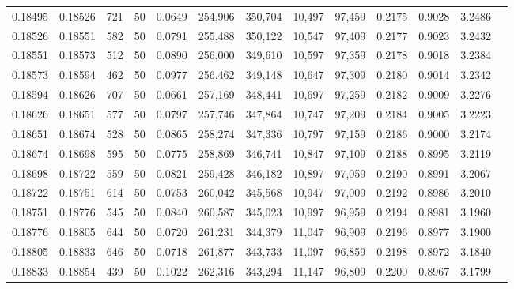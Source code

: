 \begin{tabular}{rrrrrrrrrrrrr}
0.18495 & 0.18526 &   721 &  50 &                                     0.0649 & 254,906 & 350,704 &  10,497 &  97,459 & 0.2175 & 0.9028 & 3.2486 \\
0.18526 & 0.18551 &   582 &  50 &                                     0.0791 & 255,488 & 350,122 &  10,547 &  97,409 & 0.2177 & 0.9023 & 3.2432 \\
0.18551 & 0.18573 &   512 &  50 &                                     0.0890 & 256,000 & 349,610 &  10,597 &  97,359 & 0.2178 & 0.9018 & 3.2384 \\
0.18573 & 0.18594 &   462 &  50 &                                     0.0977 & 256,462 & 349,148 &  10,647 &  97,309 & 0.2180 & 0.9014 & 3.2342 \\
0.18594 & 0.18626 &   707 &  50 &                                     0.0661 & 257,169 & 348,441 &  10,697 &  97,259 & 0.2182 & 0.9009 & 3.2276 \\
0.18626 & 0.18651 &   577 &  50 &                                     0.0797 & 257,746 & 347,864 &  10,747 &  97,209 & 0.2184 & 0.9005 & 3.2223 \\
0.18651 & 0.18674 &   528 &  50 &                                     0.0865 & 258,274 & 347,336 &  10,797 &  97,159 & 0.2186 & 0.9000 & 3.2174 \\
0.18674 & 0.18698 &   595 &  50 &                                     0.0775 & 258,869 & 346,741 &  10,847 &  97,109 & 0.2188 & 0.8995 & 3.2119 \\
0.18698 & 0.18722 &   559 &  50 &                                     0.0821 & 259,428 & 346,182 &  10,897 &  97,059 & 0.2190 & 0.8991 & 3.2067 \\
0.18722 & 0.18751 &   614 &  50 &                                     0.0753 & 260,042 & 345,568 &  10,947 &  97,009 & 0.2192 & 0.8986 & 3.2010 \\
0.18751 & 0.18776 &   545 &  50 &                                     0.0840 & 260,587 & 345,023 &  10,997 &  96,959 & 0.2194 & 0.8981 & 3.1960 \\
0.18776 & 0.18805 &   644 &  50 &                                     0.0720 & 261,231 & 344,379 &  11,047 &  96,909 & 0.2196 & 0.8977 & 3.1900 \\
0.18805 & 0.18833 &   646 &  50 &                                     0.0718 & 261,877 & 343,733 &  11,097 &  96,859 & 0.2198 & 0.8972 & 3.1840 \\
0.18833 & 0.18854 &   439 &  50 &                                     0.1022 & 262,316 & 343,294 &  11,147 &  96,809 & 0.2200 & 0.8967 & 3.1799 \\

\end{tabular}
